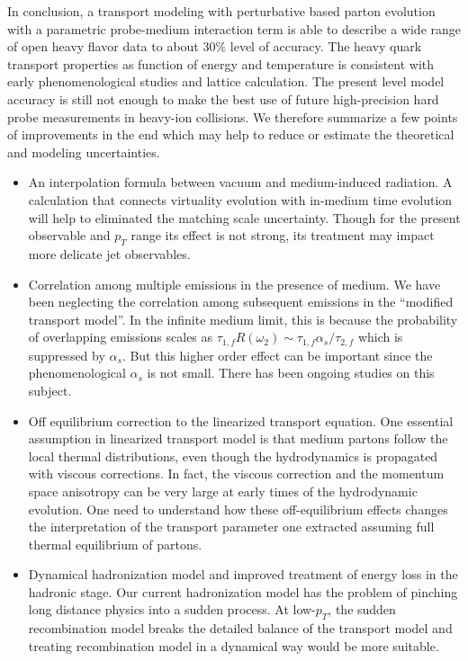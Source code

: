 In conclusion, a transport modeling with perturbative based parton evolution with a parametric probe-medium interaction term is able to describe a wide range of open heavy flavor data to about 30\% level of accuracy.
The heavy quark transport properties as function of energy and temperature is consistent with early phenomenological studies and lattice calculation.
The present level model accuracy is still not enough to make the best use of future high-precision hard probe measurements in heavy-ion collisions.
We therefore summarize a few points of improvements in the end which may help to reduce or estimate the theoretical and modeling uncertainties.
\begin{itemize}
\item An interpolation formula between vacuum and medium-induced radiation. A calculation that connects virtuality evolution with in-medium time evolution will help to eliminated the matching scale uncertainty. Though for the present observable and $p_T$ range its effect is not strong, its treatment may impact more delicate jet observables.
\item Correlation among multiple emissions in the presence of medium. We have been neglecting the correlation among subsequent emissions in the ``modified transport model''. In the infinite medium limit, this is because the probability of overlapping emissions scales as $\tau_{1,f} R(\omega_2) \sim \tau_{1,f} \alpha_s/\tau_{2,f}$ which is suppressed by $\alpha_s$. But this higher order effect can be important since the phenomenological $\alpha_s$ is not small. There has been ongoing studies on this subject.
\item Off equilibrium correction to the linearized transport equation. One essential assumption in linearized transport model is that medium partons follow the local thermal distributions, even though the hydrodynamics is propagated with viscous corrections. In fact, the viscous correction and the momentum space anisotropy can be very large at early times of the hydrodynamic evolution. One need to understand how these off-equilibrium effects changes the interpretation of the transport parameter one extracted assuming full thermal equilibrium of partons.
\item Dynamical hadronization model and improved treatment of energy loss in the hadronic stage.
Our current hadronization model has the problem of pinching long distance physics into a sudden process. 
At low-$p_T$, the sudden recombination model breaks the detailed balance of the transport model and treating recombination model in a dynamical way would be more suitable.

\end{itemize}
